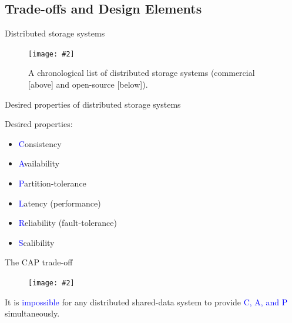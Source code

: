 \documentclass{beamer}
\makeatletter
\newcommand{\citeinbeamer}[3]{{\scriptsize{\textcolor{blue}{[#1@#2'#3]}}}}
\newcommand{\fignocaption}[2]
{
  \begin{figure}[htp]
    \centering
      \texttt{[image: \#2]}
  \end{figure}
}
\newcommand{\fig}[3]
{
  \begin{figure}[htp]
    \centering
      \texttt{[image: \#2]}
      \caption[labelInTOC]{#3}
  \end{figure}
}
\newcommand{\largepurple}[1]{\textcolor{purple}{\large #1}}
\newcommand{\largeblue}[1]{\textcolor{blue}{\large #1}}
\makeatother
\begin{document}
\subsection{Trade-offs and Design Elements}

\begin{frame}{Distributed storage systems}
  \fig{width = 0.95\textwidth}{fig/timeline-of-distributed-storage-systems.pdf}
  {A chronological list of distributed storage systems (commercial [above] and open-source
  [below]).}
\end{frame}
\begin{frame}{Desired properties of distributed storage systems}
      \begin{block}{Desired properties:}
	  \begin{itemize}
	    \item \largeblue{C}onsistency
	    \item \largeblue{A}vailability
	    \item \largeblue{P}artition-tolerance
	    \item \largeblue{L}atency (performance)
	    \item \largeblue{R}eliability (fault-tolerance)
	    \item \largeblue{S}calibility
	  \end{itemize}
	  \end{block}
\end{frame}
\begin{frame}{The CAP trade-off}

	\fignocaption{width = 0.60\textwidth}{fig/cap-theorem.pdf}

    \begin{theorem}[The \largepurple{CAP}
    theorem \citeinbeamer{Brewer}{PODC}{00},
    \citeinbeamer{Gilbert}{IEEE Computer}{12}] It is \largeblue{impossible} for
    any distributed shared-data system to provide \largeblue{C, A, and P} simultaneously.
    \end{theorem}
\end{frame}
\end{document}
